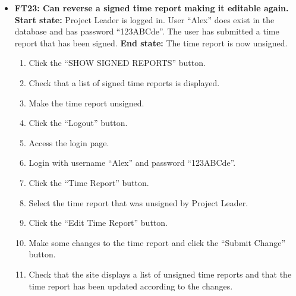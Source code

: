 \documentclass{article}
\begin{document}
\begin{itemize}
		\item \textbf{FT23: Can reverse a signed time report making it editable again.}\newline
		\textbf{Start state:} Project Leader is logged in. User “Alex” does exist in the database and has password “123ABCde”. The user has submitted a time report that has been signed.
 \newline 
		\textbf{End state:} The time report is now unsigned.
		\begin{enumerate}
			\item Click the “SHOW SIGNED REPORTS” button.
			\item Check that a list of signed time reports is displayed.
			\item Make the time report unsigned.
			\item Click the “Logout” button.
			\item Access the login page.
			\item Login with username “Alex” and password “123ABCde”.
			\item Click the “Time Report” button.
			\item Select the time report that was unsigned by Project Leader.
			\item Click the “Edit Time Report” button.
			\item Make some changes to the time report and click the “Submit Change” button.
			\item Check that the site displays a list of unsigned time reports and that the time report has been updated according to the changes.
		\end{enumerate}
\end{itemize}
\end{document}
